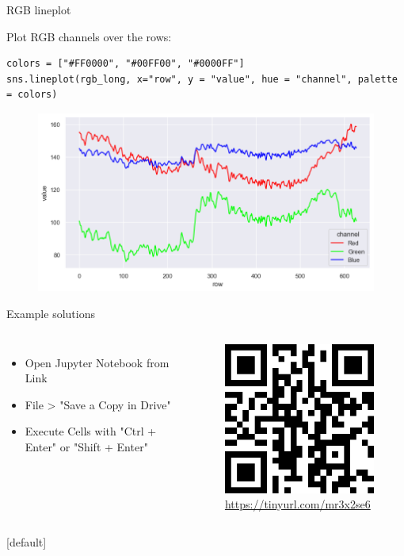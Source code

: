 \documentclass[compress%
,aspectratio=169%
]{beamer}
\begin{document}
\begin{frame}[fragile]{RGB lineplot}

Plot RGB channels over the rows:
\begin{lstlisting}
colors = ["#FF0000", "#00FF00", "#0000FF"]
sns.lineplot(rgb_long, x="row", y = "value", hue = "channel", palette = colors)
\end{lstlisting}
\begin{figure}
    \centering
    \includegraphics[width = 0.6\linewidth]{img/rgb_lines.png}
\end{figure}
\end{frame}



\begin{frame}{Example solutions}
\begin{columns}
    \begin{itemize}
    \item Open Jupyter Notebook from Link
    \item File > "Save a Copy in Drive"
    \item Execute Cells with "Ctrl + Enter" or "Shift + Enter"
\end{itemize}
    \begin{figure}
    \centering
    \includegraphics[width = 0.7\linewidth]{img/example_qr.png}
    \caption{\alert{\url{https://tinyurl.com/mr3x2se6}}}
\end{figure}
\end{columns}

\end{frame}
[default]
\end{document}
